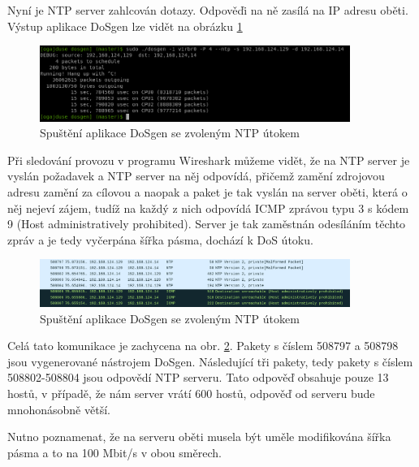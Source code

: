 Nyní je NTP server zahlcován dotazy. Odpověďi na ně zasílá na IP adresu oběti. Výstup aplikace DoSgen lze vidět na obrázku \ref{fig:dosgen_run_ntp-img}

\begin{figure} [ht]
	\centering
	\includegraphics[width=0.9\textwidth]{obrazky/dosgen_terminal_run_ntp.png} %
	\caption{Spuštění aplikace DoSgen se zvoleným NTP útokem}
	\label{fig:dosgen_run_ntp-img}
\end{figure}

Při sledování provozu v programu Wireshark můžeme vidět, že na NTP server je vyslán požadavek  a NTP server na něj odpovídá, přičemž zamění zdrojovou adresu zamění za cílovou a naopak a paket je tak vyslán na server oběti, která o něj nejeví zájem, tudíž na každý z nich odpovídá ICMP zprávou typu 3 s kódem 9 (Host administratively prohibited). Server je tak zaměstnán odesíláním těchto zpráv a je tedy vyčerpána šířka pásma, dochází k DoS útoku.

\begin{figure} [h]
	\centering
	\includegraphics[width=0.9\textwidth]
	{obrazky/mon_getlist_1_wireshark_with_icmp_and_reply.png}
	\caption{Spuštění aplikace DoSgen se zvoleným NTP útokem}
	\label{fig:mon_getlist_1_wireshark_with_icmp_and_reply-img}
\end{figure}

Celá tato komunikace je zachycena na obr. \ref{fig:mon_getlist_1_wireshark_with_icmp_and_reply-img}. Pakety s číslem 508797 a 508798 jsou vygenerované nástrojem DoSgen. Následující tři pakety, tedy pakety s číslem 508802-508804 jsou odpovědí NTP serveru. Tato odpověď obsahuje pouze 13 hostů, v případě, že nám server vrátí 600 hostů, odpověď od serveru bude mnohonásobně větší.

Nutno poznamenat, že na serveru oběti musela být uměle modifikována šířka pásma a to na 100 Mbit/s v obou směrech.






